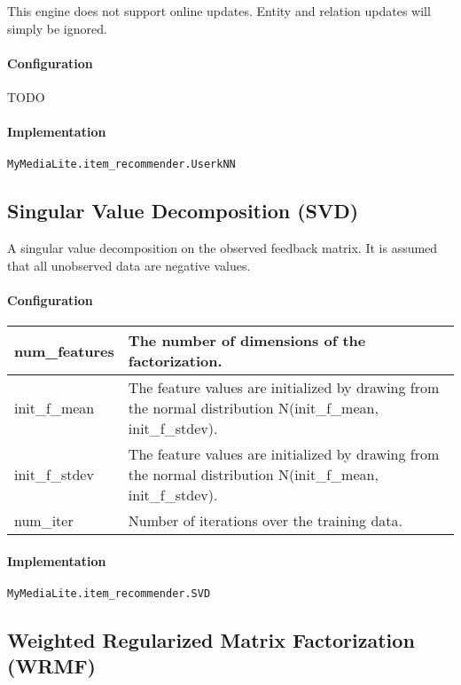 \documentclass[]{report}
\begin{document}
This engine does not support online updates. Entity and relation updates
will simply be ignored.

\paragraph[Configuration]{Configuration}
TODO

\paragraph[Implementation]{Implementation}
\texttt{MyMediaLite.item\_recommender.UserkNN}

\subsection{Singular Value Decomposition (SVD)}
A singular value decomposition on the observed feedback matrix. It is
assumed that all unobserved data are negative values.

\paragraph[Configuration]{Configuration}
\begin{flushleft}
\tablehead{}
\begin{supertabular}{|m{1.6712599in}|m{4.6781597in}|}
\hline
 num\_features &
 The number of dimensions of the
factorization.\\\hline
 init\_f\_mean &
 The feature values are initialized by
drawing from the normal distribution N(init\_f\_mean,
init\_f\_stdev).\\\hline
 init\_f\_stdev &
 The feature values are initialized by
drawing from the normal distribution N(init\_f\_mean,
init\_f\_stdev).\\\hline
 num\_iter &
 Number of iterations over the training
data.\\\hline
\end{supertabular}
\end{flushleft}

\paragraph{Implementation}
\texttt{MyMediaLite.item\_recommender.SVD}

\subsection[Weighted Regularized Matrix Factorization
(WRMF)]{Weighted Regularized Matrix Factorization (WRMF)}
\end{document}
